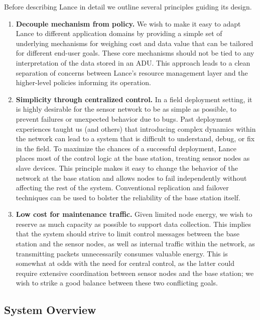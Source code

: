 Before describing Lance in detail we outline several principles guiding its
design.

\begin{enumerate}

\item \textbf{Decouple mechanism from policy.} We wish to make it easy to
adapt Lance to different application domains by providing a simple set of
underlying mechanisms for weighing cost and data value that can be tailored
for different end-user goals. These core mechanisms should not be tied to any
interpretation of the data stored in an ADU. This approach leads to a clean
separation of concerns between Lance's resource management layer and the
higher-level policies informing its operation.

\item \textbf{Simplicity through centralized control.} In a field deployment
setting, it is highly desirable for the sensor network to be as simple as
possible, to prevent failures or unexpected behavior due to bugs. Past
deployment experiences taught us (and others) that introducing complex
dynamics within the network can lead to a system that is difficult to
understand, debug, or fix in the field. To maximize the chances of a
successful deployment, Lance places most of the control logic at the base
station, treating sensor nodes as slave devices. This principle makes it easy
to change the behavior of the network at the base station and allows nodes to
fail independently without affecting the rest of the system. Conventional
replication and failover techniques can be used to bolster the reliability of
the base station itself.

\item \textbf{Low cost for maintenance traffic.} Given limited node energy,
we wish to reserve as much capacity as possible to support data collection.
This implies that the system should strive to limit control messages between
the base station and the sensor nodes, as well as internal traffic within the
network, as transmitting packets unnecessarily consumes valuable energy.
This is somewhat at odds with the need for central control, as the latter
could require extensive coordination between sensor nodes and the base
station; we wish to strike a good balance between these two conflicting
goals.

\end{enumerate}

\subsection{System Overview}

